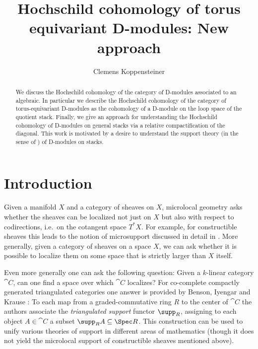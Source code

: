 \documentclass{ck-article}
\title{Hochschild cohomology of torus equivariant D-modules: New approach}
\author{Clemens Koppensteiner}
\begin{document}
\maketitle

\begin{abstract}
  We discuss the Hochschild cohomology of the category of D-modules associated to an algebraic.
  In particular we describe the Hochschild cohomology of the category of torus-equivariant D-modules as the cohomology of a D-module on the loop space of the quotient stack.
  Finally, we give an approach for understanding the Hochschild cohomology of D-modules on general stacks via a relative compactification of the diagonal.
  This work is motivated by a desire to understand the support theory (in the sense of \cite{BensonIyengarKrause:2008:LocalCohomologyAndSupportForTriangulatedCategories}) of D-modules on stacks.
\end{abstract}

\setcounter{tocdepth}{1}
\tableofcontents

\section{Introduction}

Given a manifold $X$ and a category of sheaves on $X$, microlocal geometry asks whether the sheaves can be localized not just on $X$ but also with respect to codirections, i.e.~on the cotangent space $T^*X$.
For example, for constructible sheaves this leads to the notion of microsupport discussed in detail in \cite{KashiwaraSchapira:1994:SheavesOnManifolds}.
More generally, given a category of sheaves on a space $X$, we can ask whether it is possible to localize them on some space that is strictly larger than $X$ itself.

Even more generally one can ask the following question: Given a $k$-linear category $\cat C$, can one find a space over which $\cat C$ localizes?
For co-complete compactly generated triangulated categories one answer is provided by Benson, Iyengar and Krause \cite{BensonIyengarKrause:2008:LocalCohomologyAndSupportForTriangulatedCategories}:
To each map from a graded-commutative ring $R$ to the center of $\cat C$ the authors associate the \emph{triangulated support} functor $\supp_R$, assigning to each object $A ∈ \cat C$ a subset $\supp_R A \subseteq \Spec R$.
This construction can be used to unify various theories of support in different areas of mathematics (though it does not yield the microlocal support of constructible sheaves mentioned above).
\end{document}
